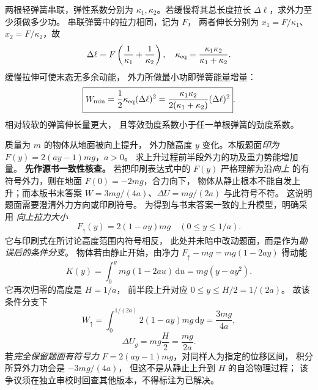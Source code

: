 两根轻弹簧串联，弹性系数分别为
$\kappa_1,\kappa_2$。若缓慢将其总长度拉长
$\Delta\ell$，求外力至少须做多少功。
\exsolution
串联弹簧中的拉力相同，记为 $F$，
两者伸长分别为 $x_1=F/\kappa_1$、
$x_2=F/\kappa_2$，故
\[
\Delta\ell=F\left(\frac1{\kappa_1}+\frac1{\kappa_2}\right),
\quad
\kappa_{\rm eq}=\frac{\kappa_1\kappa_2}{\kappa_1+\kappa_2}.
\]
缓慢拉伸可使末态无多余动能，
外力所做最小功即弹簧能量增量：
\[
\boxed{W_{\min}=
\frac12\kappa_{\rm eq}(\Delta\ell)^2
=\frac{\kappa_1\kappa_2}{2(\kappa_1+\kappa_2)}
(\Delta\ell)^2}.
\]
\excheck 相对较软的弹簧伸长量更大，
且等效劲度系数小于任一单根弹簧的劲度系数。

质量为 $m$ 的物体从地面被向上提升，
外力随高度 $y$ 变化。本版题面\emph{印为}
$F(y)=2(ay-1)mg$，$a>0$。
求上升过程前半段外力的功及重力势能增加量。
\exsolution
\textbf{先作源书一致性核查。}
若把印刷表达式中的 $F(y)$ 严格理解为沿\emph{向上}
的有符号外力，则在地面 $F(0)=-2mg$，合力向下，
物体从静止根本不能自发上升；而本版书末答案
$W=3mg/(4a)$、$\Delta U=mg/(2a)$ 与此符号不符。
这说明题面需要澄清外力方向或印刷符号。
为得到与书末答案一致的上升模型，明确采用
\emph{向上拉力大小}
\[
F_{\uparrow}(y)=2(1-ay)mg
\quad(0\le y\le 1/a).
\]
它与印刷式在所讨论高度范围内符号相反，
此处并未暗中改动题面，而是作为\emph{勘误后的条件分支}。
物体若由静止开始，由净力
$F_\uparrow-mg=mg(1-2ay)$ 得动能
\[
K(y)=\int_0^y mg(1-2au)\,\mathrm du
=mg(y-ay^2).
\]
它再次归零的高度是 $H=1/a$，
前半段上升对应 $0\le y\le H/2=1/(2a)$。
故该条件分支下
\[
\boxed{W_\uparrow=\int_0^{1/(2a)}2(1-ay)mg\,\mathrm dy
=\frac{3mg}{4a}},
\]
\[
\boxed{\Delta U_g=mg\frac{H}{2}=\frac{mg}{2a}}.
\]
\excheck 若\emph{完全保留题面有符号力}
$F=2(ay-1)mg$，对同样人为指定的位移区间，
积分所算外力功会是 $-3mg/(4a)$，
但这不是从静止上升到 $H$ 的自洽物理过程；
该争议须在独立审校时回查其他版本，不得标注为已解决。
